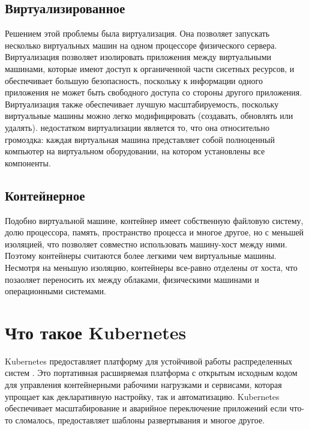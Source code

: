 \documentclass[a4page]{article}
\begin{document}
\subsection{Виртуализированное}
Решением этой проблемы была виртуализация. Она позволяет запускать несколько виртуальных машин на одном процессоре физического сервера. Виртуализация позволяет изолировать приложения между виртуальными машинами, которые имеют доступ к органиченной части сисетных ресурсов, и обеспечивает большую безопасность, поскольку к информации одного приложения не может быть свободного доступа со стороны другого приложения. Виртуализация также обеспечивает лучшую масштабируемость, поскольку виртуальные машины можно легко модифицировать (создавать, обновлять или удалять). недостатком виртуализации является то, что она относительно громоздка: каждая виртуальная машина представляет собой полноценный компьютер на виртуальном оборудовании, на котором установлены все компоненты.

\subsection{Контейнерное}
Подобно виртуальной машине, контейнер имеет собственную файловую систему, долю процессора, память, пространство процесса и многое другое, но с меньшей изоляцией, что позволяет совместно использовать машину-хост между ними. Поэтому контейнеры считаются более легкими чем виртуальные машины. Несмотря на меньшую изоляцию, контейнеры все-равно отделены от хоста, что позаоляет переносить их между облаками, физическими машинами и операционными системами.

\section{Что такое Kubernetes}
Kubernetes предоставляет платформу для устойчивой работы распределенных систем \cite{k8s:why-k8s}. Это портативная расширяемая платформа с открытым исходным кодом для управления контейнерными рабочими нагрузками и сервисами, которая упрощает как декларативную настройку, так и автоматизацию. Kubernetes обеспечивает масштабирование и аварийное переключение приложений если что-то сломалось, предоставляет шаблоны развертывания и многое другое.
\end{document}
